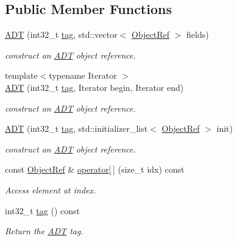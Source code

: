 \subsection*{Public Member Functions}
\begin{DoxyCompactItemize}
\item 
\hyperlink{classtvm_1_1runtime_1_1ADT_a204397cb319fdb83a72b1d9112a09caa}{A\+DT} (int32\+\_\+t \hyperlink{classtvm_1_1runtime_1_1ADT_a1a631df56a143132d60076c8038a9a97}{tag}, std\+::vector$<$ \hyperlink{classtvm_1_1runtime_1_1ObjectRef}{Object\+Ref} $>$ fields)
\begin{DoxyCompactList}\small\item\em construct an \hyperlink{classtvm_1_1runtime_1_1ADT}{A\+DT} object reference. \end{DoxyCompactList}\item 
{\footnotesize template$<$typename Iterator $>$ }\\\hyperlink{classtvm_1_1runtime_1_1ADT_aea0665ed087095ed39354064e5071d4f}{A\+DT} (int32\+\_\+t \hyperlink{classtvm_1_1runtime_1_1ADT_a1a631df56a143132d60076c8038a9a97}{tag}, Iterator begin, Iterator end)
\begin{DoxyCompactList}\small\item\em construct an \hyperlink{classtvm_1_1runtime_1_1ADT}{A\+DT} object reference. \end{DoxyCompactList}\item 
\hyperlink{classtvm_1_1runtime_1_1ADT_a9ebe228980db0256d72fc01ba5c7ae89}{A\+DT} (int32\+\_\+t \hyperlink{classtvm_1_1runtime_1_1ADT_a1a631df56a143132d60076c8038a9a97}{tag}, std\+::initializer\+\_\+list$<$ \hyperlink{classtvm_1_1runtime_1_1ObjectRef}{Object\+Ref} $>$ init)
\begin{DoxyCompactList}\small\item\em construct an \hyperlink{classtvm_1_1runtime_1_1ADT}{A\+DT} object reference. \end{DoxyCompactList}\item 
const \hyperlink{classtvm_1_1runtime_1_1ObjectRef}{Object\+Ref} \& \hyperlink{classtvm_1_1runtime_1_1ADT_a6a1dba101b18cffbd307f7c0f92a39b2}{operator\mbox{[}$\,$\mbox{]}} (size\+\_\+t idx) const 
\begin{DoxyCompactList}\small\item\em Access element at index. \end{DoxyCompactList}\item 
int32\+\_\+t \hyperlink{classtvm_1_1runtime_1_1ADT_a1a631df56a143132d60076c8038a9a97}{tag} () const 
\begin{DoxyCompactList}\small\item\em Return the \hyperlink{classtvm_1_1runtime_1_1ADT}{A\+DT} tag. \end{DoxyCompactList}\item 

\end{DoxyCompactItemize}
